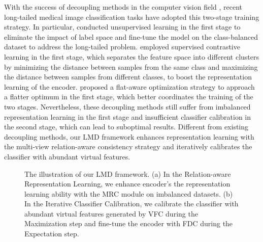 With the success of decoupling methods in the computer vision field \citep{zhou2023class, nam2023decoupled,chen2023medical}, recent long-tailed medical image classification tasks have adopted this two-stage training strategy.
In particular, \cite{chen2021self} conducted unsupervised learning in the first stage to eliminate the impact of label space and fine-tune the model on the class-balanced dataset to address the long-tailed problem.
\cite{marrakchi2021fighting} employed supervised contrastive learning in the first stage, which separates the feature space into different clusters by minimizing the distance between samples from the same class and maximizing the distance between samples from different classes, to boost the representation learning of the encoder.
\cite{li2022flat} proposed a flat-aware optimization strategy to approach a flatter optimum in the first stage, which better coordinates the training of the two stages. Nevertheless, these decoupling methods still suffer from imbalanced representation learning in the first stage and insufficient classifier calibration in the second stage, which can lead to suboptimal results. Different from existing decoupling methods, our LMD framework enhances representation learning with the multi-view relation-aware consistency strategy and iteratively calibrates the classifier with abundant virtual features.

\begin{figure*}[t]
\centering
{}
\caption{The illustration of our LMD framework. (a) In the Relation-aware Representation Learning, we enhance encoder's the representation learning ability with the MRC module on imbalanced datasets. (b) In the Iterative Classifier Calibration, we calibrate the classifier with abundant virtual features generated by VFC during the Maximization step and fine-tune the encoder with FDC during the Expectation step.} \label{fig:framework}
\end{figure*}